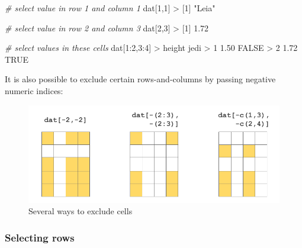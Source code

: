 \documentclass[
]{book}
\newenvironment{Shaded}{\begin{snugshade}}{\end{snugshade}}
\newcommand{\CommentTok}[1]{\textcolor[rgb]{0.56,0.35,0.01}{\textit{#1}}}
\newcommand{\ConstantTok}[1]{\textcolor[rgb]{0.00,0.00,0.00}{#1}}
\newcommand{\DecValTok}[1]{\textcolor[rgb]{0.00,0.00,0.81}{#1}}
\newcommand{\FloatTok}[1]{\textcolor[rgb]{0.00,0.00,0.81}{#1}}
\newcommand{\NormalTok}[1]{#1}
\newcommand{\SpecialCharTok}[1]{\textcolor[rgb]{0.00,0.00,0.00}{#1}}
\newcommand{\StringTok}[1]{\textcolor[rgb]{0.31,0.60,0.02}{#1}}
\begin{document}
\begin{Shaded}
\begin{Highlighting}[]
\CommentTok{\# select value in row 1 and column 1}
\NormalTok{dat[}\DecValTok{1}\NormalTok{,}\DecValTok{1}\NormalTok{]}
\SpecialCharTok{\textgreater{}}\NormalTok{ [}\DecValTok{1}\NormalTok{] }\StringTok{"Leia"}

\CommentTok{\# select value in row 2 and column 3}
\NormalTok{dat[}\DecValTok{2}\NormalTok{,}\DecValTok{3}\NormalTok{]}
\SpecialCharTok{\textgreater{}}\NormalTok{ [}\DecValTok{1}\NormalTok{] }\FloatTok{1.72}

\CommentTok{\# select values in these cells}
\NormalTok{dat[}\DecValTok{1}\SpecialCharTok{:}\DecValTok{2}\NormalTok{,}\DecValTok{3}\SpecialCharTok{:}\DecValTok{4}\NormalTok{]}
\SpecialCharTok{\textgreater{}}\NormalTok{   height  jedi}
\SpecialCharTok{\textgreater{}} \DecValTok{1}   \FloatTok{1.50} \ConstantTok{FALSE}
\SpecialCharTok{\textgreater{}} \DecValTok{2}   \FloatTok{1.72}  \ConstantTok{TRUE}
\end{Highlighting}
\end{Shaded}

It is also possible to exclude certain rows-and-columns by passing negative
numeric indices:

\begin{figure}

{\centering \includegraphics[width=0.8\linewidth]{images/objects/obj-dataframe-cells2} 

}

\caption{Several ways to exclude cells}\label{fig:unnamed-chunk-180}
\end{figure}

\hypertarget{selecting-rows-1}{%
\subsubsection*{Selecting rows}\label{selecting-rows-1}}
\end{document}

